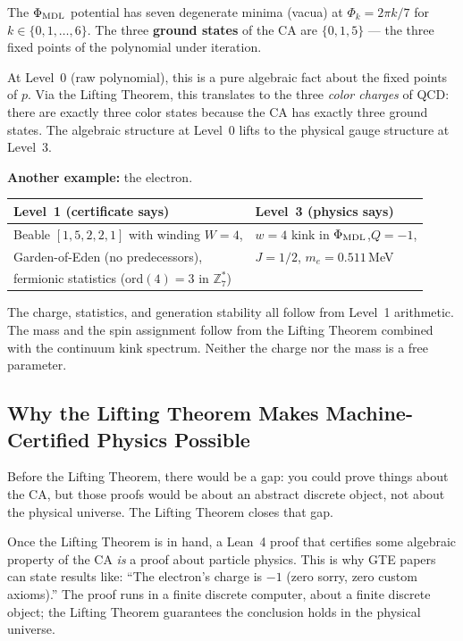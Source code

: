 \documentclass[11pt,a4paper]{article}
\newcommand{\term}[1]{\textbf{#1}}
\newcommand{\PhiMDL}{\Phi_{\rm MDL}}
\newcommand{\ZS}{\mathbb{Z}_7}
\newcommand{\poly}{p}
\begin{document}
The $\PhiMDL$ potential has seven degenerate minima (vacua) at
$\Phi_k = 2\pi k/7$ for $k \in \{0, 1, \ldots, 6\}$.
The three \term{ground states} of the CA are $\{0, 1, 5\}$ --- the three
fixed points of the polynomial under iteration.

\medskip
At Level~0 (raw polynomial), this is a pure algebraic fact about the
fixed points of $\poly$.
Via the Lifting Theorem, this translates to the three \emph{color charges}
of QCD: there are exactly three color states because the CA has exactly
three ground states.
The algebraic structure at Level~0 lifts to the physical gauge structure at
Level~3.

\medskip
\textbf{Another example:} the electron.

\medskip
\begin{center}
\begin{tabular}{@{}p{6.0cm}l@{}}
\toprule
\textbf{Level~1 (certificate says)} & \textbf{Level~3 (physics says)} \\
\midrule
Beable $[1,5,2,2,1]$ with winding $W = 4$, & $w=4$ kink in $\PhiMDL$,\quad $Q = -1$, \\
Garden-of-Eden (no predecessors), & $J = 1/2$, \quad $m_e = 0.511$\,MeV \\
fermionic statistics (ord$(4) = 3$ in $\ZS^*$) & \\
\bottomrule
\end{tabular}
\end{center}

\medskip\noindent
The charge, statistics, and generation stability all follow from Level~1
arithmetic.
The mass and the spin assignment follow from the Lifting Theorem
combined with the continuum kink spectrum.
Neither the charge nor the mass is a free parameter.

\subsection{Why the Lifting Theorem Makes Machine-Certified Physics Possible}

Before the Lifting Theorem, there would be a gap: you could prove things
about the CA, but those proofs would be about an abstract discrete object,
not about the physical universe.
The Lifting Theorem closes that gap.

\medskip
Once the Lifting Theorem is in hand, a Lean~4 proof that certifies some
algebraic property of the CA \emph{is} a proof about particle physics.
This is why GTE papers can state results like:
``The electron's charge is $-1$ (zero sorry, zero custom axioms).''
The proof runs in a finite discrete computer, about a finite discrete object;
the Lifting Theorem guarantees the conclusion holds in the physical universe.
\end{document}
